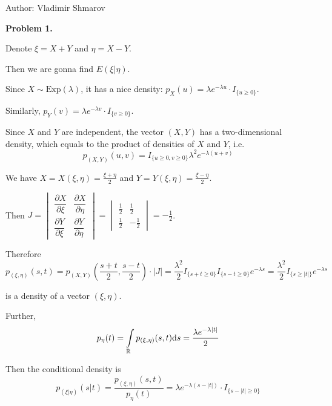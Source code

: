 \documentclass[pdftex,12pt,a4paper]{article}
\begin{document}
Author: Vladimir Shmarov
\newcommand{\ds}{\displaystyle}
\newcommand{\dx}{\mathrm{d}x}
\newcommand{\dy}{\mathrm{d}y}
\newcommand{\dz}{\mathrm{d}z}
\newcommand{\du}{\mathrm{d}u}
\newcommand{\dv}{\mathrm{d}v}


\textbf{Problem 1.}\par
Denote $\xi = X + Y$ and $\eta = X - Y$.\par
Then we are gonna find  $E(\xi| \eta)$.\par
Since $X \sim \mathrm{Exp}(\lambda)$, it has a nice density: $p_{X}(u) = \lambda e^{-\lambda u}\cdot I_{\{u \geqslant 0\}}$.\par
Similarly, $p_{Y}(v) =  \lambda e^{-\lambda v}\cdot I_{\{v \geqslant 0\}}$.\par
Since $X$ and $Y$ are independent, the vector $(X,Y)$ has a two-dimensional density, which equals to the product of densities of $X$ and $Y$, i.e.
$$
p_{(X,Y)}(u,v) = I_{\{u\geqslant 0, v\geqslant 0\}}\lambda^{2}e^{-\lambda(u+v)}
$$\par
We have $X = X(\xi, \eta) = \frac{\ds \xi + \eta}{\ds 2}$ and $Y = Y(\xi, \eta) = \frac{\ds \xi - \eta}{\ds 2}$.\par
Then $J = \begin{vmatrix}\dfrac{\ds \partial X}{\ds \partial \xi} & \dfrac{\ds \partial X}{\ds \partial \eta}\\ \dfrac{\ds \partial Y}{\ds \partial \xi}& \dfrac{\ds \partial Y}{\ds \partial \eta}
\end{vmatrix} = \begin{vmatrix}\frac{\ds 1}{\ds 2} & \frac{\ds 1}{\ds 2}\\ \frac{\ds 1}{\ds 2}& -\frac{\ds 1}{\ds 2}
\end{vmatrix} = - \frac{\ds 1}{\ds 2}$.\par
Therefore
$$
p_{(\xi, \eta)}(s,t) = p_{(X,Y)}\left(\frac{\ds s+t}{\ds 2}, \frac{\ds s-t}{\ds 2}\right)\cdot |J| = \frac{\ds \lambda^{2}}{\ds 2}I_{\{ s + t \geqslant 0\}}I_{\{s - t \geqslant 0\}}e^{-\lambda s} = \frac{\ds \lambda^{2}}{\ds 2}I_{\{ s \geqslant |t|\}}e^{-\lambda s}
$$
\par
is a density of a vector $(\xi, \eta)$.\par
Further, 
$$
p_{\eta}(t) = \int\limits_{\RR}p_{(\xi, \eta)}(s,t)\mathrm{d}s = \frac{\ds \lambda e^{-\lambda|t|}}{\ds 2}
$$\par
Then the conditional density is
$$
p_{(\xi | \eta)}(s|t) = \frac{\ds p_{(\xi, \eta)}(s,t)}{\ds p_{\eta}(t)} = \lambda e^{-\lambda(s-|t|)}\cdot I_{\{s - |t|\geqslant 0\}}
$$\par
\end{document}
